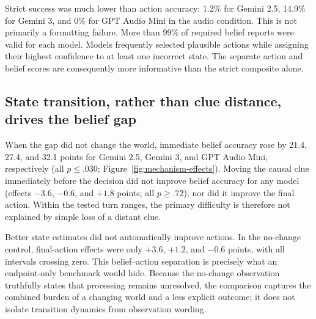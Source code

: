 \documentclass{article}
\begin{document}
Strict success was much lower than action accuracy: 1.2\% for Gemini 2.5, 14.9\% for Gemini 3, and 0\% for GPT Audio Mini in the audio condition. This is not primarily a formatting failure. More than 99\% of required belief reports were valid for each model. Models frequently selected plausible actions while assigning their highest confidence to at least one incorrect state. The separate action and belief scores are consequently more informative than the strict composite alone.

\subsection{State transition, rather than clue distance, drives the belief gap}

When the gap did not change the world, immediate belief accuracy rose by 21.4, 27.4, and 32.1 points for Gemini 2.5, Gemini 3, and GPT Audio Mini, respectively (all $p\leq.030$; Figure~\ref{fig:mechanism-effects}). Moving the causal clue immediately before the decision did not improve belief accuracy for any model (effects $-3.6$, $-0.6$, and $+1.8$ points; all $p\geq.72$), nor did it improve the final action. Within the tested turn ranges, the primary difficulty is therefore not explained by simple loss of a distant clue.

Better state estimates did not automatically improve actions. In the no-change control, final-action effects were only $+3.6$, $+1.2$, and $-0.6$ points, with all intervals crossing zero. This belief--action separation is precisely what an endpoint-only benchmark would hide. Because the no-change observation truthfully states that processing remains unresolved, the comparison captures the combined burden of a changing world and a less explicit outcome; it does not isolate transition dynamics from observation wording.
\end{document}
